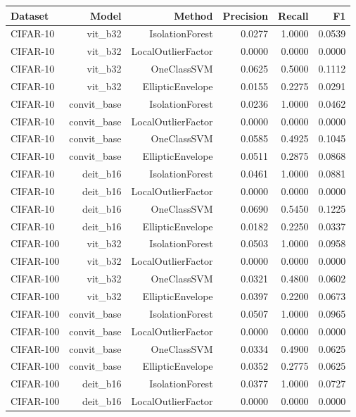 \begin{table}[htbp]
\centering
\begin{tabular}{lrrrrr}
\toprule
Dataset & Model & Method & Precision & Recall & F1 \\
\midrule
CIFAR-10 & vit\_b32 & IsolationForest & 0.0277 & 1.0000 & 0.0539 \\
CIFAR-10 & vit\_b32 & LocalOutlierFactor & 0.0000 & 0.0000 & 0.0000 \\
CIFAR-10 & vit\_b32 & OneClassSVM & 0.0625 & 0.5000 & 0.1112 \\
CIFAR-10 & vit\_b32 & EllipticEnvelope & 0.0155 & 0.2275 & 0.0291 \\
CIFAR-10 & convit\_base & IsolationForest & 0.0236 & 1.0000 & 0.0462 \\
CIFAR-10 & convit\_base & LocalOutlierFactor & 0.0000 & 0.0000 & 0.0000 \\
CIFAR-10 & convit\_base & OneClassSVM & 0.0585 & 0.4925 & 0.1045 \\
CIFAR-10 & convit\_base & EllipticEnvelope & 0.0511 & 0.2875 & 0.0868 \\
CIFAR-10 & deit\_b16 & IsolationForest & 0.0461 & 1.0000 & 0.0881 \\
CIFAR-10 & deit\_b16 & LocalOutlierFactor & 0.0000 & 0.0000 & 0.0000 \\
CIFAR-10 & deit\_b16 & OneClassSVM & 0.0690 & 0.5450 & 0.1225 \\
CIFAR-10 & deit\_b16 & EllipticEnvelope & 0.0182 & 0.2250 & 0.0337 \\
CIFAR-100 & vit\_b32 & IsolationForest & 0.0503 & 1.0000 & 0.0958 \\
CIFAR-100 & vit\_b32 & LocalOutlierFactor & 0.0000 & 0.0000 & 0.0000 \\
CIFAR-100 & vit\_b32 & OneClassSVM & 0.0321 & 0.4800 & 0.0602 \\
CIFAR-100 & vit\_b32 & EllipticEnvelope & 0.0397 & 0.2200 & 0.0673 \\
CIFAR-100 & convit\_base & IsolationForest & 0.0507 & 1.0000 & 0.0965 \\
CIFAR-100 & convit\_base & LocalOutlierFactor & 0.0000 & 0.0000 & 0.0000 \\
CIFAR-100 & convit\_base & OneClassSVM & 0.0334 & 0.4900 & 0.0625 \\
CIFAR-100 & convit\_base & EllipticEnvelope & 0.0352 & 0.2775 & 0.0625 \\
CIFAR-100 & deit\_b16 & IsolationForest & 0.0377 & 1.0000 & 0.0727 \\
CIFAR-100 & deit\_b16 & LocalOutlierFactor & 0.0000 & 0.0000 & 0.0000 \\

\end{tabular}
\end{table}
